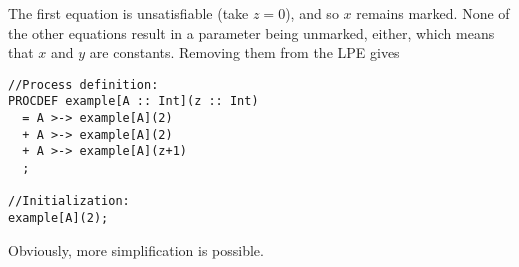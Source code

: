 The first equation is unsatisfiable (take $z=0$), and so $x$ remains marked.
None of the other equations result in a parameter being unmarked, either, which means that $x$ and $y$ are constants.
Removing them from the LPE gives

\begin{lstlisting}
//Process definition:
PROCDEF example[A :: Int](z :: Int)
  = A >-> example[A](2)
  + A >-> example[A](2)
  + A >-> example[A](z+1)
  ;

//Initialization:
example[A](2);
\end{lstlisting}

Obviously, more simplification is possible.

